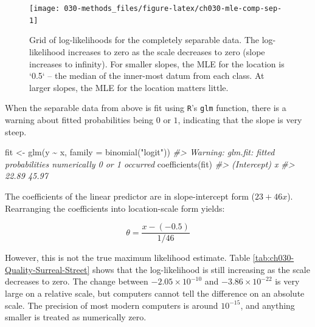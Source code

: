 \documentclass[11pt, oneside, openany]{scrbook}
\newenvironment{Shaded}{\begin{snugshade}}{\end{snugshade}}
\newcommand{\AttributeTok}[1]{\textcolor[rgb]{0.77,0.63,0.00}{#1}}
\newcommand{\CommentTok}[1]{\textcolor[rgb]{0.56,0.35,0.01}{\textit{#1}}}
\newcommand{\FunctionTok}[1]{\textcolor[rgb]{0.00,0.00,0.00}{#1}}
\newcommand{\NormalTok}[1]{#1}
\newcommand{\OtherTok}[1]{\textcolor[rgb]{0.56,0.35,0.01}{#1}}
\newcommand{\SpecialCharTok}[1]{\textcolor[rgb]{0.00,0.00,0.00}{#1}}
\newcommand{\StringTok}[1]{\textcolor[rgb]{0.31,0.60,0.02}{#1}}
\begin{document}
\begin{figure}

{\centering \texttt{[image: 030-methods\_files/figure-latex/ch030-mle-comp-sep-1]} 

}

\caption{Grid of log-likelihoods for the completely separable data. The log-likelihood increases to zero as the scale decreases to zero (slope increases to infinity). For smaller slopes, the MLE for the location is `0.5` -- the median of the inner-most datum from each class. At larger slopes, the MLE for the location matters little.}\label{fig:ch030-mle-comp-sep}
\end{figure}

When the separable data from above is fit using \texttt{R}'s \texttt{glm} function, there is a warning about fitted probabilities being \(0\) or \(1\), indicating that the slope is very steep.


\begin{Shaded}
\begin{Highlighting}[]
\NormalTok{fit }\OtherTok{\textless{}{-}} \FunctionTok{glm}\NormalTok{(y }\SpecialCharTok{\textasciitilde{}}\NormalTok{ x, }\AttributeTok{family =} \FunctionTok{binomial}\NormalTok{(}\StringTok{"logit"}\NormalTok{))}
\CommentTok{\#\textgreater{} Warning: glm.fit: fitted probabilities numerically 0 or 1 occurred}
\FunctionTok{coefficients}\NormalTok{(fit)}
\CommentTok{\#\textgreater{} (Intercept)           x }
\CommentTok{\#\textgreater{}       22.89       45.97}
\end{Highlighting}
\end{Shaded}


The coefficients of the linear predictor are in slope-intercept form (\(23 + 46 x\)). Rearranging the coefficients into location-scale form yields:

\begin{equation}
  \theta = \frac{x - (-0.5)}{1/46}
  \label{eq:rglmmle}
\end{equation}

However, this is not the true maximum likelihood estimate. Table \ref{tab:ch030-Quality-Surreal-Street} shows that the log-likelihood is still increasing as the scale decreases to zero. The change between \(-2.05\times 10^{-10}\) and \(-3.86\times10^{-22}\) is very large on a relative scale, but computers cannot tell the difference on an absolute scale. The precision of most modern computers is around \(10^{-15}\), and anything smaller is treated as numerically zero.
\end{document}
